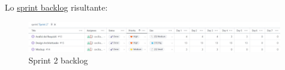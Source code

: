 Lo \href{https://github.com/orgs/ISIQuiz/projects/3/}{sprint backlog} risultante:
\begin{figure}[H]
    \centering
    \includegraphics[width=\textwidth]{process/Img/Sprint2BL.jpg}
    \caption{Sprint 2 backlog}
    \label{fig:Sprint2}
\end{figure}
